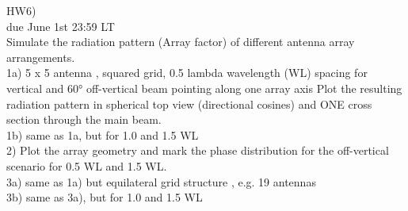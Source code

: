 \begin{taskspec}
HW6)\\

due June 1st 23:59 LT \\

Simulate the radiation pattern (Array factor) of different antenna array arrangements.\\

1a) 5 x 5 antenna , squared grid, 0.5 lambda wavelength (WL) spacing
for vertical and 60° off-vertical beam pointing along one array axis
Plot the resulting radiation pattern in spherical top view (directional cosines) and ONE cross section through the main beam.\\

1b) same as 1a, but for 1.0 and 1.5 WL\\

2) Plot the array geometry and mark the phase distribution for the off-vertical scenario for 0.5 WL and 1.5 WL.\\

3a) same as 1a) but equilateral grid structure , e.g. 19 antennas\\

3b) same as 3a), but for 1.0 and 1.5 WL\\
\end{taskspec}

